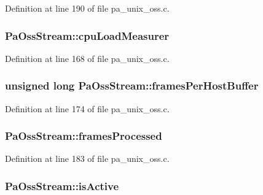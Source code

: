 Definition at line 190 of file pa\+\_\+unix\+\_\+oss.\+c.

\subsubsection[{\texorpdfstring{cpu\+Load\+Measurer}{cpuLoadMeasurer}}]{ Pa\+Oss\+Stream\+::cpu\+Load\+Measurer}\hypertarget{struct_pa_oss_stream_aa62961e9043374ae1517162fcdeec84d}{}\label{struct_pa_oss_stream_aa62961e9043374ae1517162fcdeec84d}


Definition at line 168 of file pa\+\_\+unix\+\_\+oss.\+c.

\subsubsection[{\texorpdfstring{frames\+Per\+Host\+Buffer}{framesPerHostBuffer}}]{\setlength{\rightskip}{0pt plus 5cm}unsigned long Pa\+Oss\+Stream\+::frames\+Per\+Host\+Buffer}\hypertarget{struct_pa_oss_stream_a0f4eb82448f8ed9c9fbb6637c864d61c}{}\label{struct_pa_oss_stream_a0f4eb82448f8ed9c9fbb6637c864d61c}


Definition at line 174 of file pa\+\_\+unix\+\_\+oss.\+c.

\subsubsection[{\texorpdfstring{frames\+Processed}{framesProcessed}}]{ Pa\+Oss\+Stream\+::frames\+Processed}\hypertarget{struct_pa_oss_stream_a3710a34d8822deb12fb6edcfc1abc6c9}{}\label{struct_pa_oss_stream_a3710a34d8822deb12fb6edcfc1abc6c9}


Definition at line 183 of file pa\+\_\+unix\+\_\+oss.\+c.

\subsubsection[{\texorpdfstring{is\+Active}{isActive}}]{ Pa\+Oss\+Stream\+::is\+Active}\hypertarget{struct_pa_oss_stream_ae0985c22b9f0382faede4f48cd2071ea}{}\label{struct_pa_oss_stream_ae0985c22b9f0382faede4f48cd2071ea}


